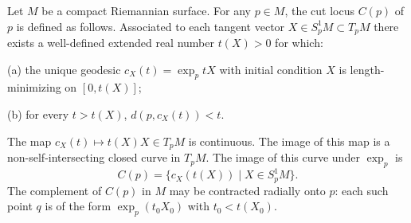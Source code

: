 Let $M$ be a compact Riemannian surface. For any $p \in M$, the cut locus $C(p)$ of $p$ is defined as follows. Associated to each tangent vector $X \in S^1_p M \subset T_p M$ there exists a well-defined extended real number $t(X) > 0$ for which:

(a) the unique geodesic $c_X(t) = \exp_p tX$ with initial condition $X$ is length-minimizing on $[0, t(X)]$;

(b) for every $t > t(X)$, $d(p, c_X(t)) < t$.

The map $c_X(t) \mapsto t(X)X \in T_p M$ is continuous. The image of this map is a non-self-intersecting closed curve in $T_p M$. The image of this curve under $\exp_p$ is
$$C(p) = \{c_X(t(X)) \mid X \in S^1_p M\}.$$
The complement of $C(p)$ in $M$ may be contracted radially onto $p$: each such point $q$ is of the form $\exp_p(t_0 X_0)$ with $t_0 < t(X_0)$.
